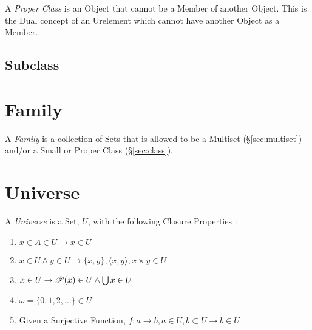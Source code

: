 A \emph{Proper Class} is an Object that cannot be a Member of another
Object. This is the Dual concept of an Urelement which cannot have
another Object as a Member.



\subsection{Subclass}\label{sec:subclass}



\section{Family}\label{sec:family}

A \emph{Family} is a collection of Sets that is allowed to be a
Multiset (\S\ref{sec:multiset}) and/or a Small or Proper Class
(\S\ref{sec:class}).



\section{Universe}\label{sec:universe}

A \emph{Universe} is a Set, $U$, with the following Closure Properties
\cite{maclane69}:
\begin{enumerate}
\item $x \in A \in U \rightarrow x \in U$
\item $x \in U \wedge y \in U \rightarrow \{x,y\}, \langle x,y
  \rangle, x \times y \in U$
\item $x \in U \rightarrow \mathscr{P}(x) \in U \wedge \bigcup x \in U$
\item $\omega = \{0,1,2,\ldots\} \in U$
\item Given a Surjective Function, $f : a \rightarrow b, a \in
  U, b \subset U \rightarrow b \in U$
\end{enumerate}



